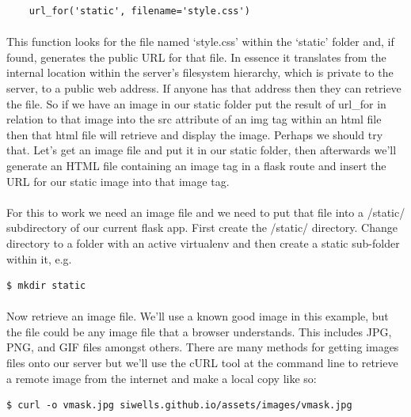 \documentclass[12pt, a4paper, oneside]{book}
\begin{document}
\begin{lstlisting}
    url_for('static', filename='style.css')
\end{lstlisting}

\paragraph{} This function looks for the file named `style.css' within the `static' folder and, if found, generates the public URL for that file. In essence it translates from the internal location within the server's filesystem hierarchy, which is private to the server, to a public web address. If anyone has that address then they can retrieve the file. So if we have an image in our static folder put the result of url\_for in relation to that image into the src attribute of an img tag within an html file then that html file will retrieve and display the image. Perhaps we should try that. Let's get an image file and put it in our static folder, then afterwards we'll generate an HTML file containing an image tag in a flask route and insert the URL for our static image into that image tag.

\paragraph{} For this to work we need an image file and we need to put that file into a /static/ subdirectory of our current flask app. First create the /static/ directory. Change directory to a folder with an active virtualenv and then create a static sub-folder within it, e.g.

\begin{lstlisting}[style=DOS]
    $ mkdir static 
\end{lstlisting}

\paragraph{} Now retrieve an image file. We'll use a known good image in this example, but the file could be any image file that a browser understands. This includes JPG, PNG, and GIF files amongst others. There are many methods for getting images files onto our server but we'll use the cURL tool at the command line to retrieve a remote image from the internet and make a local copy like so:

\begin{lstlisting}[style=DOS]
    $ curl -o vmask.jpg siwells.github.io/assets/images/vmask.jpg 
\end{lstlisting}
\end{document}
